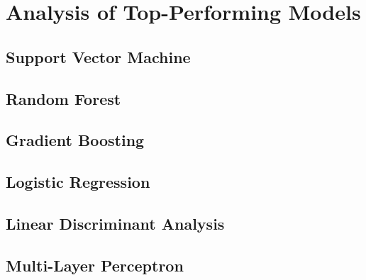    \section{Analysis of Top-Performing Models}
        \subsection{Support Vector Machine}
        \subsection{Random Forest}
        \subsection{Gradient Boosting}
        \subsection{Logistic Regression}
        \subsection{Linear Discriminant Analysis}
        \subsection{Multi-Layer Perceptron}


    
                
